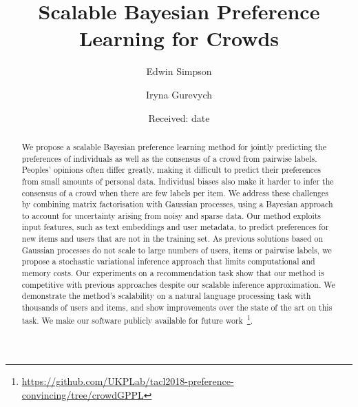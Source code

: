 \documentclass[smallcondensed,natbib]{svjour3}     %
\title{ 
Scalable Bayesian Preference Learning for Crowds
}
\author{Edwin Simpson 
\and Iryna Gurevych
}
\institute{
Edwin Simpson \and Iryna Gurevych \at
Ubiquitous Knowledge Processing Lab, Dept. of Computer Science, Technische Universit\"at Darmstadt.\\
              \email{\{simpson,gurevych\}@ukp.informatik.tu-darmstadt.de}
}
\date{Received: date}
\begin{document}


\maketitle

\begin{abstract}
We propose a scalable Bayesian preference learning method 
for jointly predicting the preferences of individuals as well as the consensus of a crowd
 from pairwise labels.
Peoples' opinions often differ greatly,
making it difficult to predict their preferences from small amounts of personal data.
Individual biases also make it harder to infer the consensus of a crowd
when there are few labels per item.
We address these challenges by combining matrix factorisation with 
Gaussian processes,
using a Bayesian approach to account for uncertainty arising from noisy and sparse data.
Our method exploits input features, such as text embeddings and user metadata,
to predict preferences for new items and users that are not in the training set.
As previous solutions based on Gaussian processes do not scale to 
large numbers of users, items or pairwise labels, 
we propose a stochastic variational inference approach that limits computational and memory costs.
Our experiments on a recommendation task show that
our method is competitive with previous approaches despite our scalable inference approximation.
We demonstrate the method's scalability on a natural language processing task 
with thousands of users and items, and show 
improvements over the state of the art on this task.
We make our software publicly available for future 
work~\footnote{\url{https://github.com/UKPLab/tacl2018-preference-convincing/tree/crowdGPPL}}.

\end{abstract}
\end{document}
